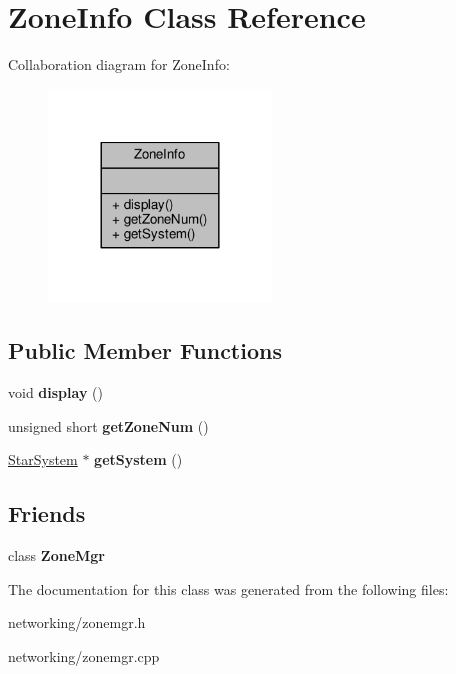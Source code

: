 \hypertarget{classZoneInfo}{}\section{Zone\+Info Class Reference}
\label{classZoneInfo}


Collaboration diagram for Zone\+Info\+:
\nopagebreak
\begin{figure}[H]
\begin{center}
\leavevmode
\includegraphics[width=168pt]{d0/d90/classZoneInfo__coll__graph}
\end{center}
\end{figure}
\subsection*{Public Member Functions}
\begin{DoxyCompactItemize}
\item 
void {\bfseries display} ()\hypertarget{classZoneInfo_a5c207489f4f09d7affc2f982684efa17}{}\label{classZoneInfo_a5c207489f4f09d7affc2f982684efa17}

\item 
unsigned short {\bfseries get\+Zone\+Num} ()\hypertarget{classZoneInfo_a24d3b9a74b3b745fd91c4ff09880b829}{}\label{classZoneInfo_a24d3b9a74b3b745fd91c4ff09880b829}

\item 
\hyperlink{classStarSystem}{Star\+System} $\ast$ {\bfseries get\+System} ()\hypertarget{classZoneInfo_a6671ff33a07a8d7fdc11b3dcbb84a44d}{}\label{classZoneInfo_a6671ff33a07a8d7fdc11b3dcbb84a44d}

\end{DoxyCompactItemize}
\subsection*{Friends}
\begin{DoxyCompactItemize}
\item 
class {\bfseries Zone\+Mgr}\hypertarget{classZoneInfo_ae0e24ddfa25f21ca918d843acdb8d513}{}\label{classZoneInfo_ae0e24ddfa25f21ca918d843acdb8d513}

\end{DoxyCompactItemize}


The documentation for this class was generated from the following files\+:\begin{DoxyCompactItemize}
\item 
networking/zonemgr.\+h\item 
networking/zonemgr.\+cpp\end{DoxyCompactItemize}
